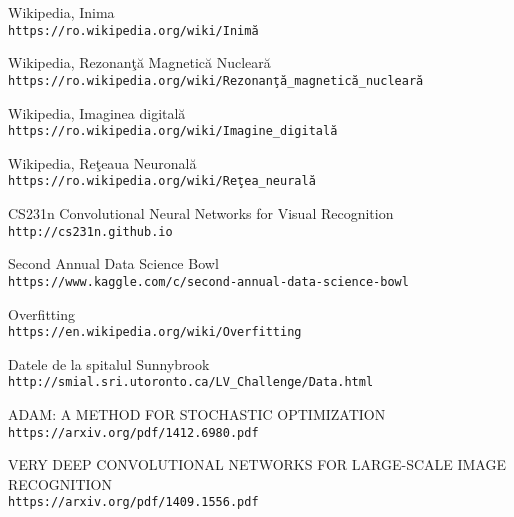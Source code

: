 \begin{thebibliography}{9} 

Wikipedia, Inima
\\\texttt{https://ro.wikipedia.org/wiki/Inim\u{a}}

Wikipedia, Rezonan\c{t}\u{a} Magnetic\u{a} Nuclear\u{a}
\\\texttt{https://ro.wikipedia.org/wiki/Rezonan\c{t}\u{a}\_magnetic\u{a}\_nuclear\u{a}}

Wikipedia, Imaginea digital\u{a}
\\\texttt{https://ro.wikipedia.org/wiki/Imagine\_digital\u{a}}

Wikipedia, Re\c{t}eaua Neuronal\u{a}
\\\texttt{https://ro.wikipedia.org/wiki/Re\c{t}ea\_neural\u{a}}

CS231n Convolutional Neural Networks for Visual Recognition
\\\texttt{http://cs231n.github.io}

Second Annual Data Science Bowl
\\\texttt{https://www.kaggle.com/c/second-annual-data-science-bowl}

Overfitting
\\\texttt{https://en.wikipedia.org/wiki/Overfitting}

Datele de la spitalul Sunnybrook
\\\texttt{http://smial.sri.utoronto.ca/LV\_Challenge/Data.html}

ADAM: A METHOD FOR STOCHASTIC OPTIMIZATION
\\\texttt{https://arxiv.org/pdf/1412.6980.pdf}

VERY DEEP CONVOLUTIONAL NETWORKS FOR LARGE-SCALE IMAGE RECOGNITION
\\\texttt{https://arxiv.org/pdf/1409.1556.pdf}

\end{thebibliography}
